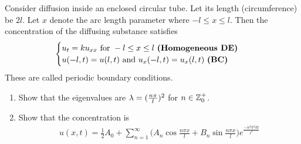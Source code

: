 \documentclass{report}
\begin{document}
\begin{question}{}{}
Consider diffusion inside an enclosed circular tube. Let its length (circumference) be $2l$. Let  $x$ denote the arc length parameter where  $-l\leq x\leq l$. Then the concentration of the diffusing substance satisfies 
\begin{align*}
\begin{cases}
  u_t=ku_{xx}\text{ for }-l \leq x\leq l \text{ \textbf{(Homogeneous DE)} }\\
  u(-l,t)=u(l,t)\text{ and }u_x(-l,t)=u_x(l,t)\text{ \textbf{(BC)} } 
\end{cases}
\end{align*}
These are called periodic boundary conditions. 
\begin{enumerate}[label=(\alph*)]
  \item Show that the eigenvalues are $\lambda = (\frac{n \pi}{l})^2$ for $n\in\mathbb{Z}_0^+$.
  \item Show that the concentration is 
    \begin{align*}
    u(x,t)= \frac{1}{2}A_0+ \sum_{n=1}^{\infty}\Big(A_n \cos \frac{n \pi x}{l}+ B_n \sin \frac{n \pi x}{l} \Big)e^{\frac{-n^2\pi ^2 kt}{l^2}}
    \end{align*}
\end{enumerate}
\end{question}
\end{document}
